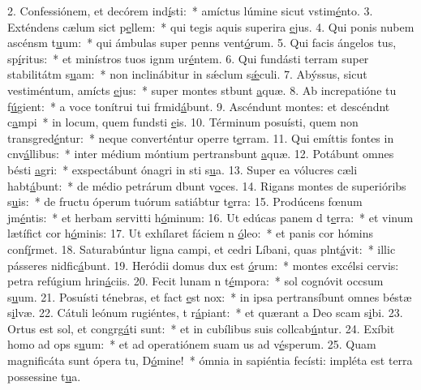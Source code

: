 2. Confessiónem, et decórem ind\uline{í}sti:~* amíctus lúmine sicut vstim\uline{é}nto.
3. Exténdens cælum sict p\uline{e}llem:~* qui tegis aquis superira \uline{e}jus.
4. Qui ponis nubem ascénsm t\uline{u}um:~* qui ámbulas super penns vent\uline{ó}rum.
5. Qui facis ángelos tus, sp\uline{í}ritus:~* et minístros tuos ignm ur\uline{é}ntem.
6. Qui fundásti terram super stabilitátm s\uline{u}am:~* non inclinábitur in sǽclum s\uline{ǽ}culi.
7. Abýssus, sicut vestiméntum, amícts \uline{e}jus:~* super montes stbunt \uline{a}quæ.
8. Ab increpatióne tu f\uline{ú}gient:~* a voce tonítrui tui frmid\uline{á}bunt.
9. Ascéndunt montes: et descéndnt c\uline{a}mpi~* in locum, quem fundsti \uline{e}is.
10. Términum posuísti, quem non transgred\uline{é}ntur:~* neque converténtur operre t\uline{e}rram.
11. Qui emíttis fontes in cnv\uline{á}llibus:~* inter médium móntium pertransbunt \uline{a}quæ.
12. Potábunt omnes bésti \uline{a}gri:~* exspectábunt ónagri in sti s\uline{u}a.
13. Super ea vólucres cæli habt\uline{á}bunt:~* de médio petrárum dbunt v\uline{o}ces.
14. Rigans montes de superióribs s\uline{u}is:~* de fructu óperum tuórum satiábtur t\uline{e}rra:
15. Prodúcens fœnum jm\uline{é}ntis:~* et herbam servitti h\uline{ó}minum:
16. Ut edúcas panem d t\uline{e}rra:~* et vinum lætífict cor h\uline{ó}minis:
17. Ut exhílaret fáciem n \uline{ó}leo:~* et panis cor hómins conf\uline{í}rmet.
18. Saturabúntur ligna campi, et cedri Líbani, quas plnt\uline{á}vit:~* illic pásseres nidfic\uline{á}bunt.
19. Heródii domus dux est \uline{ó}rum:~* montes excélsi cervis: petra refúgium hrin\uline{á}ciis.
20. Fecit lunam n t\uline{é}mpora:~* sol cognóvit occsum s\uline{u}um.
21. Posuísti ténebras, et fact \uline{e}st nox:~* in ipsa pertransíbunt omnes béstæ s\uline{i}lvæ.
22. Cátuli leónum rugiéntes, t r\uline{á}piant:~* et quærant a Deo scam s\uline{i}bi.
23. Ortus est sol, et congrg\uline{á}ti sunt:~* et in cubílibus suis collcab\uline{ú}ntur.
24. Exíbit homo ad ops s\uline{u}um:~* et ad operatiónem suam us ad v\uline{é}sperum.
25. Quam magnificáta sunt ópera tu, D\uline{ó}mine!~* ómnia in sapiéntia fecísti: impléta est terra possessine t\uline{u}a.
